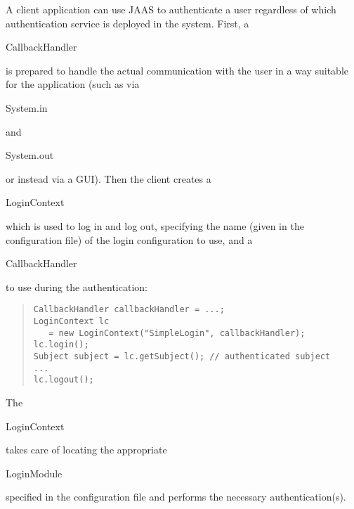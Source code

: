 A client application can use JAAS to authenticate a user regardless of which
authentication service is deployed in the system. First, a
\begin{code}CallbackHandler\end{code} is prepared to handle the
actual communication with the user in a way suitable for the application
(such as via \begin{code}System.in\end{code} and \begin{code}System.out\end{code}
or instead via a GUI). Then the client creates a \begin{code}LoginContext\end{code}
which is used to log in and log out,
specifying the name (given in the configuration file) of the login
configuration to use, and a \begin{code}CallbackHandler\end{code} to use during
the authentication:
\begin{quote}\begin{code}\begin{verbatim}
CallbackHandler callbackHandler = ...;
LoginContext lc
   = new LoginContext("SimpleLogin", callbackHandler);
lc.login();
Subject subject = lc.getSubject(); // authenticated subject
...
lc.logout();
\end{verbatim}\end{code}\end{quote}
The \begin{code}LoginContext\end{code} takes care of locating the appropriate
\begin{code}LoginModule\end{code} specified in the configuration file and
performs the necessary authentication(s).


